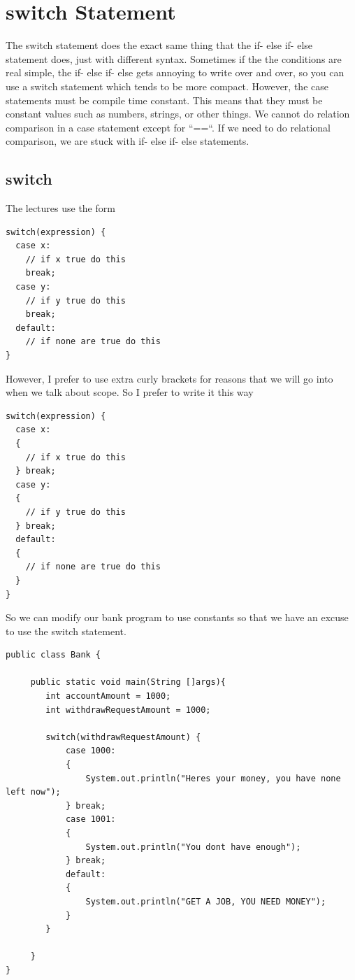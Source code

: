 \documentclass[11]{article}
\begin{document}
\section{switch Statement}
The switch statement does the exact same thing that the if- else if- else statement does, just with different syntax. Sometimes if the the conditions are real simple, the if- else if- else gets annoying to write over and over, so you can use a switch statement which tends to be more compact. However, the case statements must be compile time constant. This means that they must be constant values such as numbers, strings, or other things. We cannot do relation comparison in a case statement except for ``==``. If we need to do relational comparison, we are stuck with if- else if- else statements.

\subsection{switch}
The lectures use the form
\begin{lstlisting}
switch(expression) {
  case x:
    // if x true do this
    break;
  case y:
    // if y true do this
    break;
  default:
    // if none are true do this
}
\end{lstlisting}

However, I prefer to use extra curly brackets for reasons that we will go into when we talk about scope. So I prefer to write it this way

\begin{lstlisting}
switch(expression) {
  case x:
  {
    // if x true do this
  } break;
  case y:
  {
    // if y true do this
  } break;
  default:
  {
    // if none are true do this
  }
}
\end{lstlisting}

So we can modify our bank program to use constants so that we have an excuse to use the switch statement.

\begin{lstlisting}
public class Bank {

     public static void main(String []args){
        int accountAmount = 1000;
        int withdrawRequestAmount = 1000;
        
        switch(withdrawRequestAmount) {
            case 1000:
            {
                System.out.println("Heres your money, you have none left now");
            } break;
            case 1001:
            {
                System.out.println("You dont have enough");
            } break;
            default:
            {
                System.out.println("GET A JOB, YOU NEED MONEY");
            }
        }
        
     }
}
\end{lstlisting}
\end{document}
